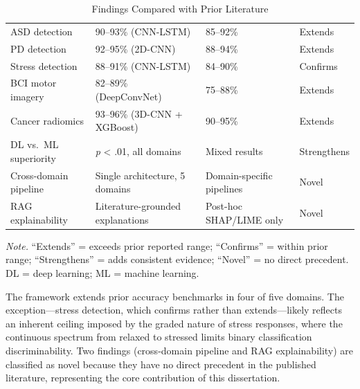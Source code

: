 \begin{table}[H]
\tablestripes
\begin{tabularx}{\textwidth}{L L L L}
\toprule
{} &  &  &  \\
\midrule
ASD detection & 90--93\% (CNN-LSTM) & 85--92\% \citep{bosl2018eeg} & Extends \\
PD detection & 92--95\% (2D-CNN) & 88--94\% \citep{geraedts2018eeg} & Extends \\
Stress detection & 88--91\% (CNN-LSTM) & 84--90\% \citep{alshargie2018mental} & Confirms \\
BCI motor imagery & 82--89\% (DeepConvNet) & 75--88\% \citep{pfurtscheller1999bci} & Extends \\
Cancer radiomics & 93--96\% (3D-CNN + XGBoost) & 90--95\% \citep{aerts2014radiomics} & Extends \\
DL vs.\ ML superiority & \textit{p} < .01, all domains & Mixed results \citep{lecun2015deep} & Strengthens \\
Cross-domain pipeline & Single architecture, 5 domains & Domain-specific pipelines \citep{craik2019eeg} & Novel \\
RAG explainability & Literature-grounded explanations & Post-hoc SHAP/LIME only \citep{arrieta2020xai} & Novel \\
\bottomrule
\end{tabularx}
\caption{Findings Compared with Prior Literature}
\label{tab:literature_comparison}
\vspace{0.5em}\noindent\textit{Note.} ``Extends'' = exceeds prior reported range; ``Confirms'' = within prior range; ``Strengthens'' = adds consistent evidence; ``Novel'' = no direct precedent. DL = deep learning; ML = machine learning.
\end{table}

The framework extends prior accuracy benchmarks in four of five domains. The exception---stress detection, which confirms rather than extends---likely reflects an inherent ceiling imposed by the graded nature of stress responses, where the continuous spectrum from relaxed to stressed limits binary classification discriminability. Two findings (cross-domain pipeline and RAG explainability) are classified as novel because they have no direct precedent in the published literature, representing the core contribution of this dissertation.


